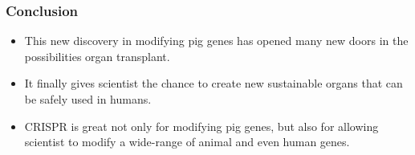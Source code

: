 \documentclass{beamer}
\begin{document}
\begin{frame}
\frametitle{Conclusion}
\begin{itemize}
\item This new discovery in modifying pig genes has opened many new doors in the possibilities organ transplant.
\item It finally gives scientist the chance to create new sustainable organs that can be safely used in humans. 
\item
CRISPR is great not only for modifying pig genes, but also for allowing scientist to modify a wide-range of animal and even human genes. 
\end{itemize} 
\end{frame}
\end{document}
